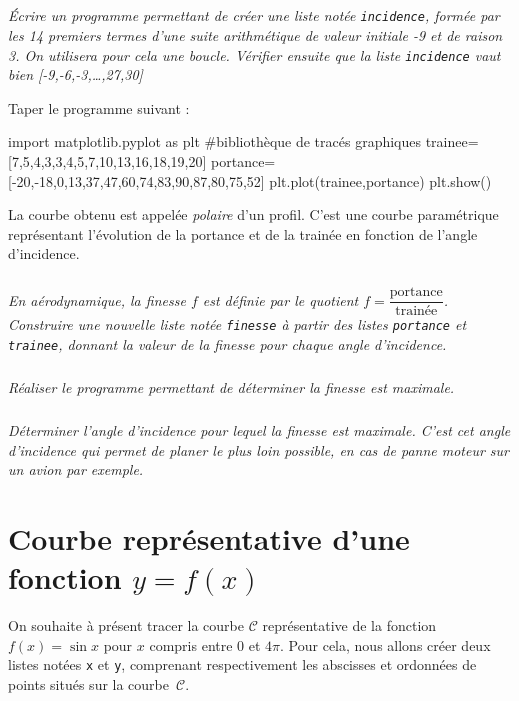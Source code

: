 \documentclass[10pt]{article}
\begin{document}
\subparagraph{}
\textit{\'Ecrire un programme permettant de créer une liste notée \texttt{incidence}, formée par les 14 premiers termes d'une suite arithmétique de valeur initiale -9 et de raison 3. On utilisera pour cela une boucle. Vérifier ensuite que la liste \texttt{incidence} vaut bien [-9,-6,-3,\ldots{},27,30]}



Taper le programme suivant :
\begin{py}
\begin{python}
import matplotlib.pyplot as plt			#bibliothèque de tracés graphiques
trainee=[7,5,4,3,3,4,5,7,10,13,16,18,19,20]
portance=[-20,-18,0,13,37,47,60,74,83,90,87,80,75,52]
plt.plot(trainee,portance)
plt.show()
\end{python}
\end{py}

\begin{rem}
La courbe obtenu est appelée \emph{polaire} d'un profil. C'est une courbe paramétrique représentant l'évolution de la portance et de la trainée en fonction de l'angle d'incidence.
\end{rem}

\subparagraph{}
\textit{En aérodynamique, la finesse $f$ est définie par le quotient $f=\dfrac{\text{portance}}{\text{trainée}}$. Construire une nouvelle liste notée \texttt{finesse} à partir des listes \texttt{portance} et \texttt{trainee}, donnant la valeur de la finesse pour chaque angle d'incidence.}

\subparagraph{}
\textit{Réaliser le programme permettant de déterminer la finesse est maximale.}

\subparagraph{}
\textit{Déterminer l'angle d'incidence pour lequel la finesse est maximale.
  C'est cet angle d'incidence qui permet de planer le plus loin possible, en cas de panne moteur sur un avion par exemple.}




\section{Courbe représentative d'une fonction $y=f(x)$}
\setcounter{subparagraph}{0}
On souhaite à présent tracer la courbe $\mathcal{C}$ représentative de la fonction $f(x)=\sin x$ pour $x$ compris entre 0 et $4\pi$. Pour cela, nous allons créer deux listes notées \texttt{x} et \texttt{y}, comprenant respectivement les abscisses et ordonnées de points situés sur la courbe~$\mathcal{C}$.
\end{document}
